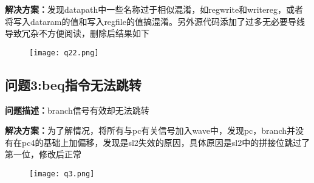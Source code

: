 \textbf{解决方案：}发现datapath中一些名称过于相似混淆，如regwrite和writereg，或者将写入dataram的值和写入regfile的值搞混淆。另外源代码添加了过多无必要导线导致冗杂不方便阅读，删除后结果如下
\begin{figure}[htbp]
    \centering
    \texttt{[image: q22.png]}
    \label{图3}
\end{figure}

\subsection{问题3:beq指令无法跳转}
\textbf{问题描述：}branch信号有效却无法跳转

\textbf{解决方案：}为了解情况，将所有与pc有关信号加入wave中，发现pc，branch并没有在pc4的基础上加偏移，发现是sl2失效的原因，具体原因是sl2中的拼接位跳过了第一位，修改后正常
\begin{figure}[htbp]
    \centering
    \texttt{[image: q3.png]}
    \label{图4}
\end{figure}
